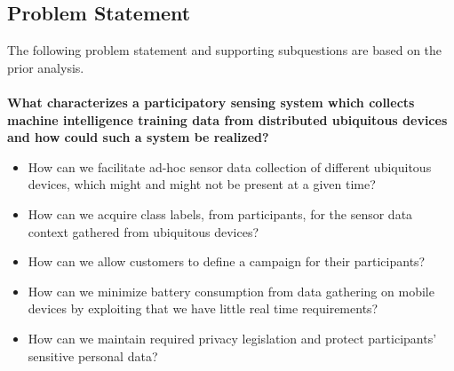 \subsection{Problem Statement}
\label{sub:problem_statement}

The following problem statement and supporting subquestions are based on the prior analysis.
\\\\
\textbf{What characterizes a participatory sensing system which collects machine intelligence training data from distributed ubiquitous devices and how could such a system be realized?}

\begin{itemize}
    \item How can we facilitate ad-hoc sensor data collection of different ubiquitous devices, which might and might not be present at a given time?
    \item How can we acquire class labels, from participants, for the sensor data context gathered from ubiquitous devices?  
    \item How can we allow customers to define a campaign for their participants?
    \item How can we minimize battery consumption from data gathering on mobile devices by exploiting that we have little real time requirements?
    \item How can we maintain required privacy legislation and protect participants' sensitive personal data? 
\end{itemize}

